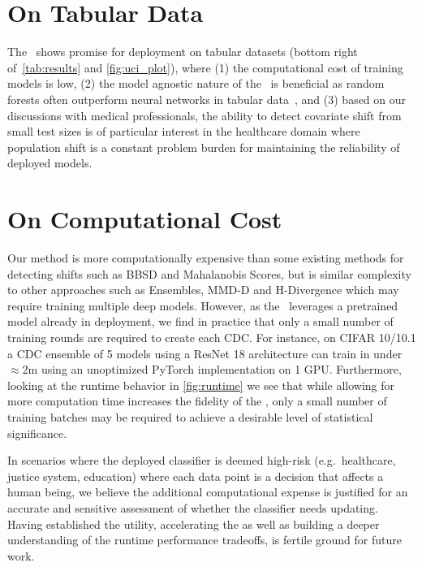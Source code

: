 \section{On Tabular Data}
The \method\ shows promise for deployment on tabular datasets (bottom right of\ \autoref{tab:results} and \autoref{fig:uci_plot}),
where (1) the computational cost of training models is low, (2) the model agnostic nature of the \method\ is beneficial as random forests often outperform neural networks in tabular data~\citep{tabdatasurvey}, and
(3) based on our discussions with medical professionals, the ability to detect covariate shift from small test sizes is of particular interest in the healthcare domain
where population shift is a constant problem burden for maintaining the reliability of deployed models.

\section{On Computational Cost} Our method is more computationally expensive than some existing methods for detecting shifts such as BBSD and Mahalanobis Scores, but is similar complexity to other approaches such as Ensembles, MMD-D and H-Divergence which may require training multiple deep models.
However, as the \method\ leverages a pretrained model already in deployment, we find in practice that only a small number of training rounds are required to create each CDC.
For instance, on CIFAR 10/10.1 a CDC ensemble of 5 models using a ResNet 18 architecture can train in under $\approx 2$m using an unoptimized PyTorch implementation on 1 GPU.
Furthermore, looking at the runtime behavior in \autoref{fig:runtime} we see that while allowing for more computation time increases the fidelity of the \method,
only a small number of training batches may be required to achieve a desirable level of statistical significance.

In scenarios where the deployed classifier is deemed high-risk (e.g.\ healthcare, justice system, education)
where each data point is a decision that affects a human being, we believe the additional computational expense is justified for an accurate and sensitive assessment of whether the classifier needs updating.
Having established the utility, accelerating the \method\;as well as building a deeper understanding of the runtime performance tradeoffs, is fertile ground for future work.

